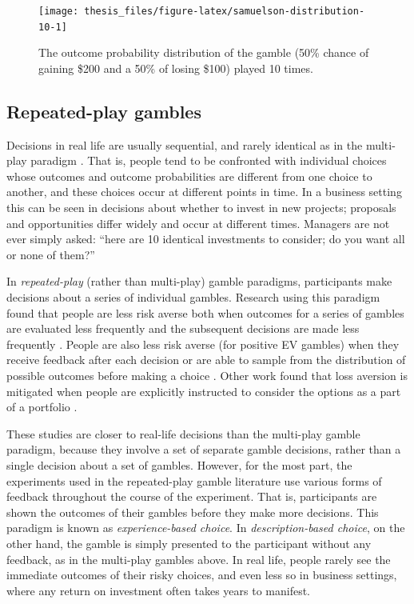 \documentclass[a4paper, nobind, dvipsnames]{templates/ociamthesis}
\theoremstyle{definition}
\theoremstyle{definition}
\theoremstyle{definition}
\theoremstyle{definition}
\theoremstyle{remark}
\begin{document}
\begin{figure}
\texttt{[image: thesis\_files/figure-latex/samuelson-distribution-10-1]} \caption{The outcome probability distribution of the \textcite{samuelson1963} gamble (50\% chance of gaining \$200 and a 50\% of losing \$100) played 10 times.}\label{fig:samuelson-distribution-10}
\end{figure}

\subsection{Repeated-play gambles}

Decisions in real life are usually sequential, and rarely identical as in the
multi-play paradigm \autocite[cf.][]{barron2003}. That is, people tend to be confronted
with individual choices whose outcomes and outcome probabilities are different
from one choice to another, and these choices occur at different points in time.
In a business setting this can be seen in decisions about whether to invest in
new projects; proposals and opportunities differ widely and occur at different
times. Managers are not ever simply asked: ``here are 10 identical investments to
consider; do you want all or none of them?''

In \emph{repeated-play} (rather than multi-play) gamble paradigms, participants make
decisions about a series of individual gambles. Research using this paradigm
found that people are less risk averse both when outcomes for a series of
gambles are evaluated less frequently and the subsequent decisions are made less
frequently \autocite{gneezy1997,thaler1997,bellemare2005,beshears2016}. People are
also less risk averse (for positive EV gambles) when they receive feedback after
each decision or are able to sample from the distribution of possible outcomes
before making a choice \autocite{camilleri2011,camilleri2013,barron2003,wulff2018,ludvig2011,hertwig2004,jessup2008}. Other work found that loss aversion is
mitigated when people are explicitly instructed to consider the options as a
part of a portfolio \autocite{sokolhessner2009,sokolhessner2012}.

These studies are closer to real-life decisions than the multi-play gamble
paradigm, because they involve a set of separate gamble decisions, rather than a
single decision about a set of gambles. However, for the most part, the
experiments used in the repeated-play gamble literature use various forms of
feedback throughout the course of the experiment. That is, participants are
shown the outcomes of their gambles before they make more decisions. This
paradigm is known as \emph{experience-based choice}. In \emph{description-based choice},
on the other hand, the gamble is simply presented to the participant without any
feedback, as in the multi-play gambles above. In real life, people rarely see
the immediate outcomes of their risky choices, and even less so in business
settings, where any return on investment often takes years to manifest.
\end{document}
